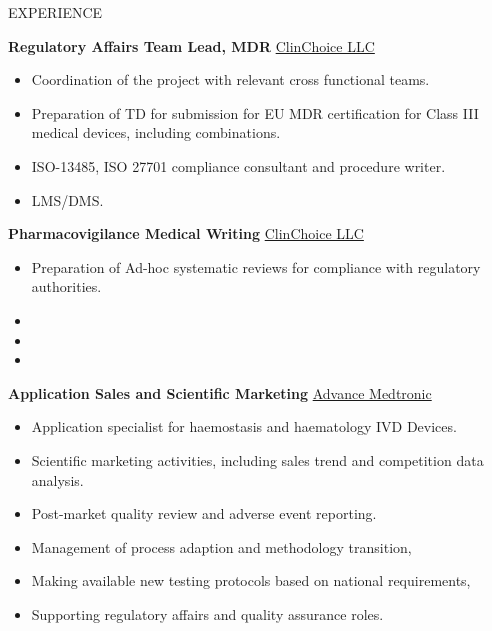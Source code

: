 \documentclass{resume}
\begin{document}
\begin{rSection}{EXPERIENCE}
\vspace{-1.25em}
\item \textbf{Regulatory Affairs Team Lead, MDR} \hfill \href{https://clinchoice.com/solutions/medical-device-regulatory-affairs/technical-document-submission-approval-preparation/}{ClinChoice LLC}
\begin{itemize}
    \itemsep -3pt {}
    \item Coordination of the project with relevant cross functional teams.
    \item Preparation of TD for submission for EU MDR certification for Class III medical devices, including combinations.
    \item ISO-13485, ISO 27701 compliance consultant and procedure writer.
    \item LMS/DMS.
 \end{itemize}

\item \textbf{Pharmacovigilance Medical Writing} \hfill \href{https://clinchoice.com/solutions/medical-device-regulatory-affairs/technical-document-submission-approval-preparation/}{ClinChoice LLC}
\begin{itemize}
    \itemsep -3pt {}
    \item Preparation of Ad-hoc systematic reviews for compliance with regulatory authorities.
    \item 
    \item
    \item
 \end{itemize}
 
\item \textbf{Application Sales and Scientific Marketing} \hfill {\href{https://www.sysmex-europe.com/products/diagnostics/haemostasis.html}{Advance Medtronic}}
\begin{itemize}
    \itemsep -3pt {} 
     \item Application specialist for haemostasis and haematology IVD Devices.
     \item Scientific marketing activities, including sales trend and competition data analysis.
     \item Post-market quality review and adverse event reporting.
     \item Management of process adaption and methodology transition,
     \item Making available new testing protocols based on national requirements,
     \item Supporting regulatory affairs and quality assurance roles.
 \end{itemize}

\end{rSection}
\end{document}
